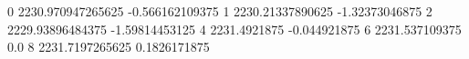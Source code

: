 0 2230.970947265625 -0.566162109375
1 2230.21337890625 -1.32373046875
2 2229.93896484375 -1.59814453125
4 2231.4921875 -0.044921875
6 2231.537109375 0.0
8 2231.7197265625 0.1826171875
